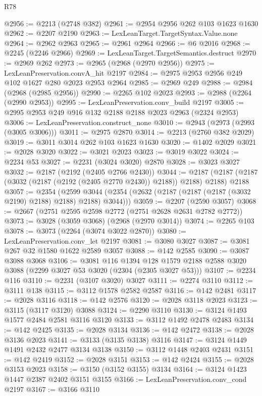 \begin{lexlean}{R78}
\begin{coremodule}
@2956 := @2213 (@2748 @382)
@2961 := @2954 @2956 @262 @103 @1623 @1630
@2962 := @2207 @2190
@2963 := LexLeanTarget.TargetSyntax.Value.none
@2964 := @2962 @2963
@2965 := @2961 @2964
@2966 := @6 @2016
@2968 := @2245 (@2246 @2966)
@2969 := LexLeanTarget.TargetSemantics.destruct
@2970 := @2969 @262
@2973 := @2965 (@2968 (@2970 @2956))
@2975 := LexLeanPreservation.convA_hit @2197
@2984 := @2975 @2953 @2956 @249 @102 @1627 @280 @2023 @2953 @2964
@2985 := @2969 @249
@2988 := @2984 (@2968 (@2985 @2956))
@2990 := @2265 @102 @2023
@2993 := @2988 (@2264 (@2990 @2953))
@2995 := LexLeanPreservation.conv_build @2197
@3005 := @2995 @2953 @249 @916 @132 @2188 @2188 @2023 @2963 (@2324 @2953)
@3006 := LexLeanPreservation.construct_none
@3010 := @2943 (@2973 (@2993 (@3005 @3006)))
@3011 := @2975 @2870
@3014 := @2213 (@2760 @382 @2029)
@3019 := @3011 @3014 @262 @103 @1623 @1630
@3020 := @1402 @2029
@3021 := @2028 @3020
@3022 := @3021 @2023
@3023 := @3019 @3022
@3024 := @2234 @53
@3027 := @2231 (@3024 @3020) @2870
@3028 := @3023 @3027
@3032 := @2187 (@2192 (@2405 @2766 @2430))
@3044 := @2187 (@2187 (@2187 (@3032 (@2187 (@2192 (@2405 @2770 @2430)) @2188)) @2188) @2188) @2188
@3057 := @2354
    (@2599 @3044 (@2354 (@2632 (@2187 (@2187 (@2187 (@3032 @2190) @2188) @2188) @2188) @3044)))
@3059 := @2207 (@2590 @3057)
@3068 := @2667 (@2751 @2595 @2598 @2772 (@2751 @2628 @2631 @2782 @2772))
@3073 := @3028 (@3059 @3068) (@2968 (@2970 @3014))
@3074 := @2265 @103
@3078 := @3073 (@2264 (@3074 @3022 @2870))
@3080 := LexLeanPreservation.conv_let @2197
@3081 := @3080 @3027
@3087 := @3081 @267 @32 @1580 @1622 @2589 @3057
@3088 := @142 @2585
@3090 := @3087 @3088 @3068
@3106 := @3081
    @116
    @1394
    @128
    @1579
    @2188
    @2588
    @3020
    @3088
    (@2299 @3027 @53 @3020 (@2304 (@2305 @3027 @53)))
@3107 := @2234 @116
@3110 := @2231 (@3107 @3020) @3027
@3111 := @2274 @3110
@3112 := @3111 @138
@3115 := @3112 @1578 @2582 @2587
@3116 := @142 @2481
@3117 := @2028 @3116
@3118 := @142 @2576
@3120 := @2028 @3118 @2023
@3123 := @3115 (@3117 @3120) @3088
@3124 := @2290 @3110
@3130 := @3124 @1493 @1577 @2484 @2581 @3116 @3120
@3133 := @3112 @1492 @2478 @2483
@3134 := @142 @2425
@3135 := @2028 @3134
@3136 := @142 @2472
@3138 := @2028 @3136 @2023
@3141 := @3133 (@3135 @3138) @3116
@3147 := @3124 @1449 @1491 @2432 @2477 @3134 @3138
@3150 := @3112 @1448 @2403 @2431
@3151 := @142 @2419
@3152 := @2028 @3151
@3153 := @142 @2424
@3155 := @2028 @3153 @2023
@3158 := @3150 (@3152 @3155) @3134
@3164 := @3124 @1423 @1447 @2387 @2402 @3151 @3155
@3166 := LexLeanPreservation.conv_cond @2197
@3167 := @3166 @3110

\end{coremodule}
\end{lexlean}
